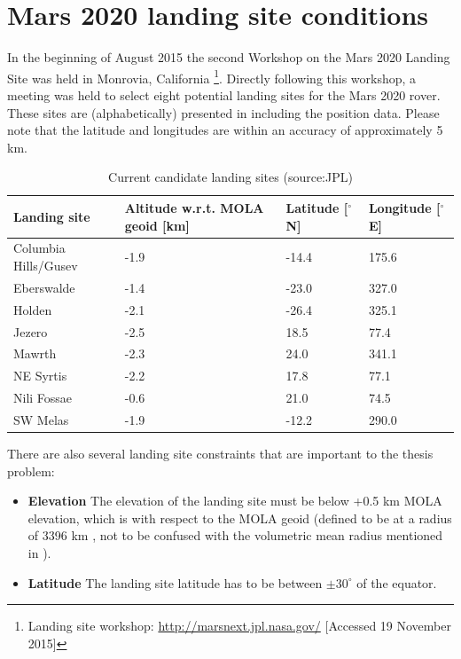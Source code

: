 \section{Mars 2020 landing site conditions}
\label{sec:2020_land_con}
In the beginning of August 2015 the second Workshop on the Mars 2020 Landing Site was held in Monrovia, California \footnote{\label{foot:landsite} Landing site workshop: \url{http://marsnext.jpl.nasa.gov/} [Accessed 19 November 2015]}. Directly following this workshop, a meeting was held to select eight potential landing sites for the Mars 2020 rover. These sites are (alphabetically) presented in  including the position data. Please note that the latitude and longitudes are within an accuracy of approximately 5 km.


\begin{table}[!ht]
\begin{center}
\caption{Current candidate landing sites (source:\ac{JPL})}
\label{tab:potential_land_site_char}
\begin{tabular}{|l|l|l|l|}
\hline 
\textbf{Landing site} 	& \textbf{Altitude w.r.t. MOLA geoid [km]} & \textbf{Latitude [$^\circ$N]} & \textbf{Longitude [$^\circ$E]} \\ \hline \hline
Columbia Hills/Gusev &-1.9 & -14.4 & 175.6\\ \hline
Eberswalde & -1.4 & -23.0 & 327.0 \\ \hline
Holden & -2.1 & -26.4 & 325.1 \\ \hline
Jezero & -2.5 & 18.5 & 77.4 \\ \hline
Mawrth & -2.3 & 24.0 & 341.1 \\ \hline
NE Syrtis & -2.2 & 17.8 & 77.1 \\ \hline
Nili Fossae & -0.6 & 21.0 & 74.5 \\ \hline
SW Melas & -1.9 & -12.2 & 290.0 \\ \hline
 
\end{tabular}
\end{center}
\end{table}

There are also several landing site constraints that are important to the thesis problem:

\begin{itemize}
\item \textbf{Elevation}  The elevation of the landing site must be below +0.5 km MOLA elevation, which is with respect to the MOLA geoid (defined to be at a radius of 3396 km \cite{smith1998relationship,smith2001mars,barlow2008mars}, not to be confused with the volumetric mean radius mentioned in \cite{williams2015}). %
\item \textbf{Latitude} The landing site latitude has to be between $\pm30^{\circ}$ of the equator.
\end{itemize}

